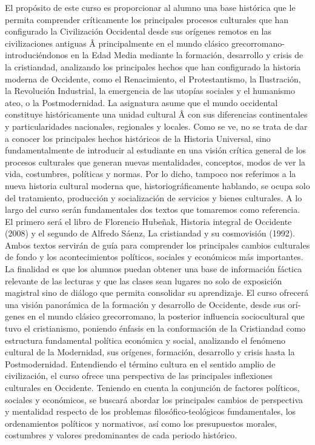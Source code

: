 \begin{syllabus}


\begin{justification}
El propósito de este curso es proporcionar al alumno una base histórica que le permita comprender crí­ticamente los principales procesos culturales que han configurado la Civilización Occidental desde sus orí­genes remotos en las civilizaciones antiguas Â principalmente en el mundo clásico grecorromano- introduciéndonos en la Edad Media mediante la formación, desarrollo y crisis de la cristiandad,  analizando los principales hechos que han configurado la historia moderna de Occidente, como el Renacimiento, el Protestantismo, la Ilustración, la Revolución Industrial, la emergencia de las utopí­as sociales y el humanismo ateo, o la Postmodernidad.
La asignatura asume que el mundo occidental constituye históricamente una unidad cultural Â con sus diferencias continentales y particularidades nacionales, regionales y locales.
Como se ve, no se trata de dar a conocer los principales hechos históricos de la Historia Universal,  sino fundamentalmente de introducir al estudiante en una visión crí­tica general de los procesos culturales que generan nuevas mentalidades, conceptos, modos de ver la vida, costumbres, polí­ticas y normas. Por lo dicho, tampoco nos referimos a la nueva historia cultural moderna que, historiográficamente hablando, se ocupa solo del tratamiento, producción y socialización de servicios y bienes culturales.
A lo largo del curso serán fundamentales dos textos que tomaremos como referencia. El primero será el libro de Florencio Hubeñak, Historia integral de Occidente (2008) y el segundo de Alfredo Sáenz, La cristiandad y su cosmovisión (1992). Ambos textos servirán de guí­a para comprender los principales cambios culturales de fondo y los acontecimientos polí­ticos, sociales y económicos más importantes.
La finalidad es que los alumnos puedan obtener una base de información fáctica relevante de las lecturas y que las clases sean lugares no solo de exposición magistral sino de diálogo que permita consolidar su aprendizaje.
El curso ofrecerá una visión panorámica de la formación y desarrollo de Occidente, desde sus orí­genes en el mundo clásico grecorromano, la posterior influencia sociocultural que tuvo el cristianismo, poniendo énfasis en la conformación de la Cristiandad como estructura fundamental polí­tica económica y social, analizando el fenómeno cultural de la Modernidad, sus orí­genes, formación, desarrollo y crisis hasta la Postmodernidad.  Entendiendo el término cultura en el sentido amplio de civilización, el curso ofrece una perspectiva de las principales inflexiones culturales en Occidente.
Teniendo en cuenta la conjunción de factores polí­ticos, sociales y económicos, se buscará abordar los principales cambios de perspectiva y mentalidad respecto de los problemas filosófico-teológicos fundamentales, los ordenamientos polí­ticos y normativos, así­ como los presupuestos morales, costumbres y valores predominantes de cada periodo histórico.
\end{justification}


\end{syllabus}
